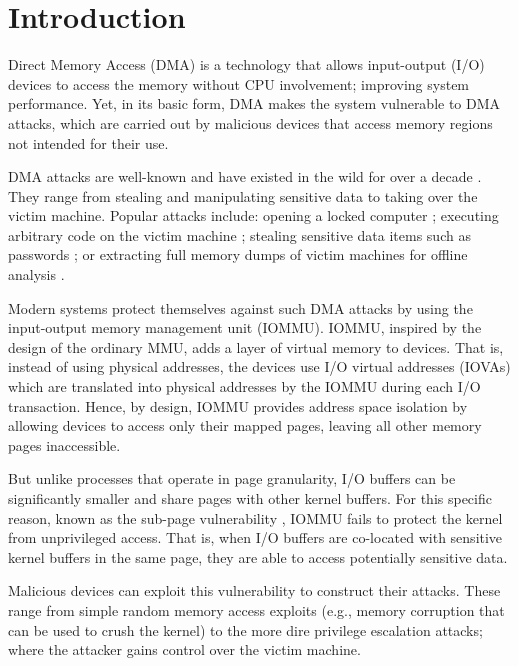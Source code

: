 \section{Introduction}

Direct Memory Access (DMA) is a technology that allows input-output (I/O) devices to access the memory without CPU involvement; improving system performance.  
Yet, in its basic form, DMA makes the system vulnerable to DMA attacks, which are carried out by malicious devices that access memory regions not intended for their use. 


DMA attacks are well-known and have existed in the wild for over a decade \cite{Dor04,BDK10,thunder}. They range from stealing and manipulating sensitive data to taking over the victim machine. Popular attacks include: opening a locked computer \cite{MM, Fin14}; executing arbitrary code on the victim machine \cite{Fri16, Woj08, AD10,thunder}; stealing sensitive data items such as passwords \cite{SB12, LKV13, Cim16, BR12}; or extracting full memory dumps of victim machines for offline analysis \cite{MM, Vol, Fin14, GA10}. 

Modern systems protect themselves against such DMA attacks by using the input-output memory management unit (IOMMU). IOMMU, inspired by the design of the ordinary MMU, adds a layer of virtual memory to devices. That is, instead of using physical addresses, the devices use I/O virtual addresses (IOVAs) which are translated into physical addresses by the IOMMU during each I/O transaction. Hence, by design, IOMMU provides address space isolation by allowing devices to access only their mapped pages, leaving all other memory pages inaccessible. 

But unlike processes that operate in page granularity, I/O buffers can be significantly smaller and share pages with other kernel buffers. For this specific reason, known as the sub-page vulnerability \cite{MMT16,thunder}, IOMMU fails to protect the kernel from unprivileged access. That is, when I/O buffers are co-located with sensitive kernel buffers in the same page, they are able to access potentially sensitive data. 

Malicious devices can exploit this vulnerability to construct their attacks. These range from simple random memory access exploits (e.g., memory corruption that can be used to crush the kernel) to the more dire privilege escalation attacks; where the attacker gains control over the victim machine.

